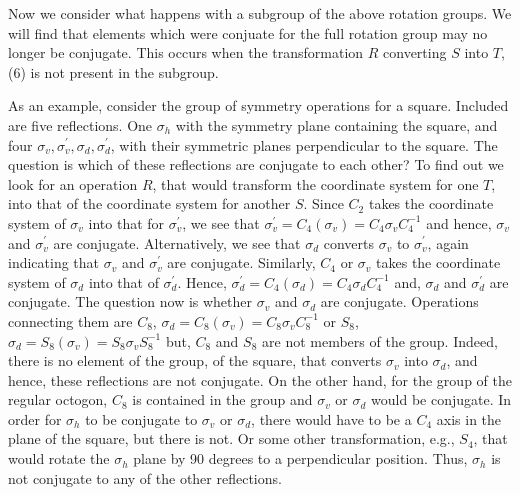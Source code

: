 Now we consider what happens with a subgroup of the above rotation 
groups.  We will find that elements which were conjuate for the full 
rotation group may no longer be conjugate.  This occurs when the 
transformation $R$ converting $S$ into $T$, (6) is not present in the 
subgroup.

\begin{figure}
\caption{}
\label{chap16-fig4}
\end{figure}

As an example, consider the group of symmetry operations for a square. 
Included are five reflections.  One $\sigma_h$ with the symmetry plane 
containing the square, and four  $\sigma_v , 
\sigma_v^{\prime} , \sigma_d , \sigma_d^{\prime}$, with their symmetric 
planes perpendicular to the square.
The question is which of these reflections are conjugate to each 
other?  To find out we look for an operation $R$, that would transform 
the coordinate system for one $T$, into that of the coordinate system 
for another $S$. Since $C_2$ takes the coordinate system of 
$\sigma_v$ into that for $\sigma_v^{\prime}$, we see that 
$\sigma_v^{\prime} = C_4 (\sigma_v ) = C_4 \sigma_v C_4^{-1}$ and 
hence, $\sigma_v$ and $\sigma_v^{\prime}$ are conjugate.  
Alternatively, we see that $\sigma_d$ converts $\sigma_v$ to 
$\sigma^{\prime}_v$, again indicating that $\sigma_v$ and 
$\sigma_v^{\prime}$ are conjugate.  Similarly, $C_4$ or $\sigma_v$ 
takes the coordinate system of $\sigma_d$ into that of 
$\sigma_d^{\prime}$.  Hence, $\sigma_d^{\prime} = C_4(\sigma_d) = C_4 
\sigma_d C_4^{-1}$ and, $\sigma_d$ and $\sigma_d^{\prime}$ are 
conjugate.  The question now is whether $\sigma_v$ and $\sigma_d$ are 
conjugate.  Operations connecting them are $C_8$, $\sigma_d = C_8 
(\sigma_v) = C_8 \sigma_v C_8^{-1}$ or $S_8$, $\sigma_d = S_8 ( 
\sigma_v)=S_8 \sigma_v S_8^{-1}$ but, $C_8$ and $S_8$ are not members 
of the group.  Indeed, there is no element of the group, of the 
square, that converts $\sigma_v$ into $\sigma_d$, and hence, these 
reflections are not conjugate.  On the other hand, for the group of 
the regular octogon, $C_8$ is contained in the group and $\sigma_v$ 
or $\sigma_d$ would be conjugate.  In order for $\sigma_h$ to be 
conjugate to $\sigma_v$ or $\sigma_d$, there would have to be a $C_4$ 
axis in the plane of the square, but there is not.  Or some other 
transformation, e.g., $S_4$, that would rotate the $\sigma_h$ plane 
by 90 degrees to a perpendicular position. Thus, $\sigma_h$ is not 
conjugate to any of the other reflections.

